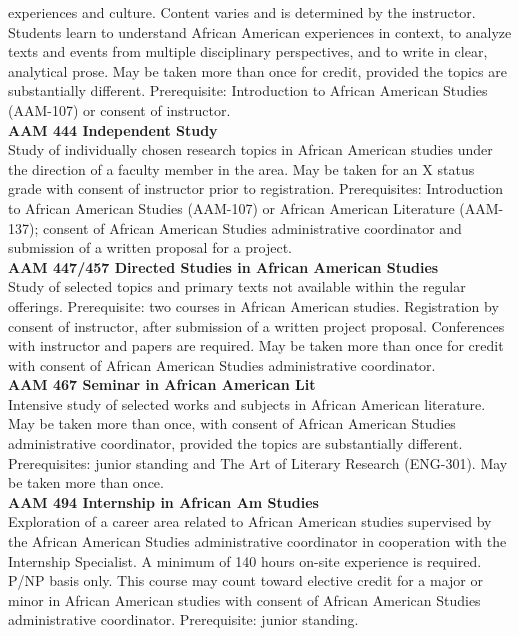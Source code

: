 \documentclass[
  letterpaper,
]{scrbook}
\begin{document}
experiences and culture. Content varies and is determined by the
instructor. Students learn to understand African American experiences in
context, to analyze texts and events from multiple disciplinary
perspectives, and to write in clear, analytical prose. May be taken more
than once for credit, provided the topics are substantially different.
Prerequisite: Introduction to African American Studies (AAM-107) or
consent of instructor.\\
\textbf{AAM 444 Independent Study}\\
Study of individually chosen research topics in African American studies
under the direction of a faculty member in the area. May be taken for an
X status grade with consent of instructor prior to registration.
Prerequisites: Introduction to African American Studies (AAM-107) or
African American Literature (AAM-137); consent of African American
Studies administrative coordinator and submission of a written proposal
for a project.\\
\textbf{AAM 447/457 Directed Studies in African American Studies}\\
Study of selected topics and primary texts not available within the
regular offerings. Prerequisite: two courses in African American
studies. Registration by consent of instructor, after submission of a
written project proposal. Conferences with instructor and papers are
required. May be taken more than once for credit with consent of African
American Studies administrative coordinator.\\
\textbf{AAM 467 Seminar in African American Lit}\\
Intensive study of selected works and subjects in African American
literature. May be taken more than once, with consent of African
American Studies administrative coordinator, provided the topics are
substantially different. Prerequisites: junior standing and The Art of
Literary Research (ENG-301). May be taken more than once.\\
\textbf{AAM 494 Internship in African Am Studies}\\
Exploration of a career area related to African American studies
supervised by the African American Studies administrative coordinator in
cooperation with the Internship Specialist. A minimum of 140 hours
on-site experience is required. P/NP basis only. This course may count
toward elective credit for a major or minor in African American studies
with consent of African American Studies administrative coordinator.
Prerequisite: junior standing.
\end{document}
